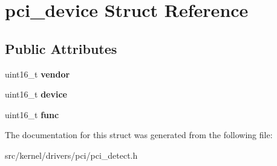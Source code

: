 \hypertarget{structpci__device}{}\section{pci\+\_\+device Struct Reference}
\label{structpci__device}
\subsection*{Public Attributes}
\begin{DoxyCompactItemize}
\item 
\mbox{\label{structpci__device_ab840ec920ec120bd8c4723ded957b2c0}} 
uint16\+\_\+t {\bfseries vendor}
\item 
\mbox{\label{structpci__device_abc6a726a69de7f41a5d969e7507da276}} 
uint16\+\_\+t {\bfseries device}
\item 
\mbox{\label{structpci__device_a5e114da69cb2d79a67bd99709df15515}} 
uint16\+\_\+t {\bfseries func}
\end{DoxyCompactItemize}


The documentation for this struct was generated from the following file\+:\begin{DoxyCompactItemize}
\item 
src/kernel/drivers/pci/pci\+\_\+detect.\+h\end{DoxyCompactItemize}
